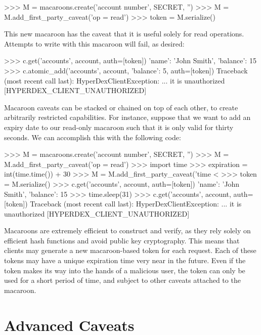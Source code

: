 \begin{pythoncode}
>>> M = macaroons.create('account number', SECRET, '')
>>> M = M.add_first_party_caveat('op = read')
>>> token = M.serialize()
\end{pythoncode}

This new macaroon has the caveat that it is useful solely for read operations.
Attempts to write with this macaroon will fail, as desired:

\begin{pythoncode}
>>> c.get('accounts', account, auth=[token])
{'name': 'John Smith', 'balance': 15}
>>> c.atomic_add('accounts', account, {'balance': 5}, auth=[token])
Traceback (most recent call last):
HyperDexClientException: ... it is unauthorized [HYPERDEX_CLIENT_UNAUTHORIZED]
\end{pythoncode}

Macaroon caveats can be stacked or chained on top of each other, to create
arbitrarily restricted capabilities. For instance, suppose that we want to add
an expiry date to our read-only macaroon such that it is only valid for thirty
seconds. We can accomplish this with the following code:

\begin{pythoncode}
>>> M = macaroons.create('account number', SECRET, '')
>>> M = M.add_first_party_caveat('op = read')
>>> import time
>>> expiration = int(time.time()) + 30
>>> M = M.add_first_party_caveat('time < %
>>> token = M.serialize()
>>> c.get('accounts', account, auth=[token])
{'name': 'John Smith', 'balance': 15}
>>> time.sleep(31)
>>> c.get('accounts', account, auth=[token])
Traceback (most recent call last):
HyperDexClientException: ... it is unauthorized [HYPERDEX_CLIENT_UNAUTHORIZED]
\end{pythoncode}

Macaroons are extremely efficient to construct and verify, as they rely solely
on efficient hash functions and avoid public key cryptography. This means that
clients may generate a new macaroon-based token for each request.  Each of these
tokens may have a unique expiration time very near in the future.  Even if the
token makes its way into the hands of a malicious user, the token can only be
used for a short period of time, and subject to other caveats attached to the
macaroon.

\section{Advanced Caveats}

